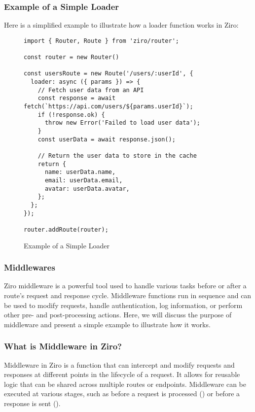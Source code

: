 \subsubsection*{Example of a Simple Loader}
Here is a simplified example to illustrate how a loader function works in Ziro:
\begin{figure}[h!]
\begin{verbatim}
import { Router, Route } from 'ziro/router';

const router = new Router()

const usersRoute = new Route('/users/:userId', {
  loader: async ({ params }) => {
    // Fetch user data from an API
    const response = await fetch(`https://api.com/users/${params.userId}`);
    if (!response.ok) {
      throw new Error('Failed to load user data');
    }
    const userData = await response.json();

    // Return the user data to store in the cache
    return {
      name: userData.name,
      email: userData.email,
      avatar: userData.avatar,
    };
  };
});

router.addRoute(router);
\end{verbatim}
\caption{Example of a Simple Loader}
\end{figure}


\subsubsection{Middlewares}
Ziro middleware is a powerful tool used to handle various tasks before or after a route's request and response cycle. Middleware functions run in sequence and can be used to modify requests, handle authentication, log information, or perform other pre- and post-processing actions. Here, we will discuss the purpose of middleware and present a simple example to illustrate how it works.

\subsubsection*{What is Middleware in Ziro?}
Middleware in Ziro is a function that can intercept and modify requests and responses at different points in the lifecycle of a request. It allows for reusable logic that can be shared across multiple routes or endpoints. Middleware can be executed at various stages, such as before a request is processed () or before a response is sent ().

